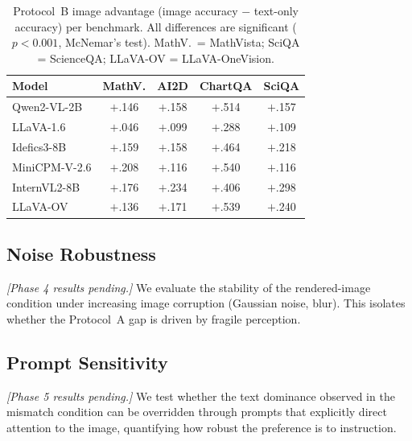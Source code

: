\documentclass[11pt]{article}
\begin{document}
\begin{table}[h]
\centering
\small
\setlength{\tabcolsep}{4pt}
\begin{tabular}{lcccc}
\toprule
\textbf{Model} & \textbf{MathV.} & \textbf{AI2D} & \textbf{ChartQA} & \textbf{SciQA} \\
\midrule
Qwen2-VL-2B   & $+$.146 & $+$.158 & $+$.514 & $+$.157 \\
LLaVA-1.6     & $+$.046 & $+$.099 & $+$.288 & $+$.109 \\
Idefics3-8B   & $+$.159 & $+$.158 & $+$.464 & $+$.218 \\
MiniCPM-V-2.6 & $+$.208 & $+$.116 & $+$.540 & $+$.116 \\
InternVL2-8B  & $+$.176 & $+$.234 & $+$.406 & $+$.298 \\
LLaVA-OV      & $+$.136 & $+$.171 & $+$.539 & $+$.240 \\
\bottomrule
\end{tabular}
\caption{Protocol~B image advantage (image accuracy $-$ text-only accuracy) per benchmark. All differences are significant ($p{<}0.001$, McNemar's test). MathV.\ = MathVista; SciQA = ScienceQA; LLaVA-OV = LLaVA-OneVision.}
\label{tab:protocolb}
\end{table}

\subsection{Noise Robustness}
\label{sec:noise}
\textit{[Phase 4 results pending.]} We evaluate the stability of the rendered-image condition under increasing image corruption (Gaussian noise, blur). This isolates whether the Protocol~A gap is driven by fragile perception.

\subsection{Prompt Sensitivity}
\label{sec:prompt}
\textit{[Phase 5 results pending.]} We test whether the text dominance observed in the mismatch condition can be overridden through prompts that explicitly direct attention to the image, quantifying how robust the preference is to instruction.
\end{document}
